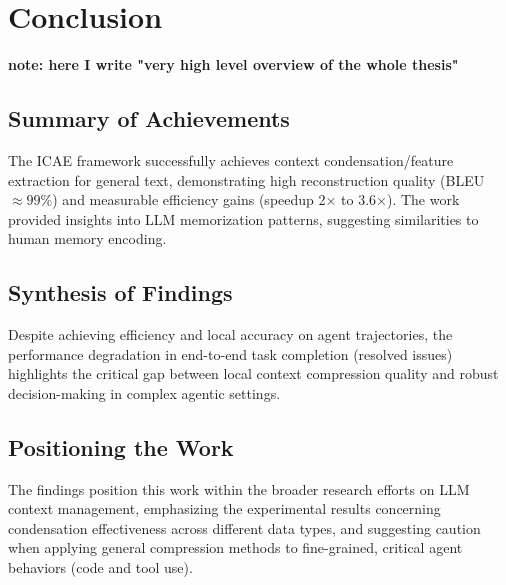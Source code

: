 \chapter{Conclusion}

\textbf{note: here I write "very high level overview of the whole thesis"}

\section{Summary of Achievements}

The ICAE \cite{ge_-context_2024} framework successfully achieves context condensation/feature extraction for general text, demonstrating high reconstruction quality (BLEU $\approx 99\%$) and measurable efficiency gains (speedup 2× to 3.6×).
The work provided insights into LLM memorization patterns, suggesting similarities to human memory encoding.


\section{Synthesis of Findings}

Despite achieving efficiency and local accuracy on agent trajectories, the performance degradation in end-to-end task completion (resolved issues) highlights the critical gap between local context compression quality and robust decision-making in complex agentic settings.


\section{Positioning the Work}

The findings position this work within the broader research efforts on LLM context management, emphasizing the experimental results concerning condensation effectiveness across different data types, and suggesting caution when applying general compression methods to fine-grained, critical agent behaviors (code and tool use).
